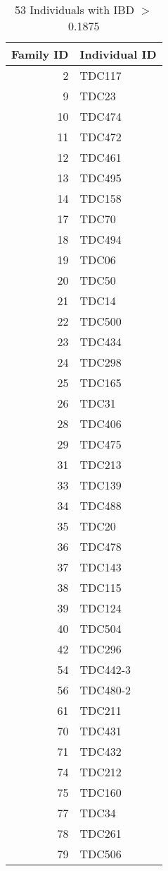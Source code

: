 \begin{table}[ht]
\centering
\caption{53 Individuals with IBD $>$ 0.1875 }
\begin{tabular}{rl}
  \hline
Family ID & Individual ID \\ 
  \hline
  2 & TDC117 \\ 
    9 & TDC23 \\ 
   10 & TDC474 \\ 
   11 & TDC472 \\ 
   12 & TDC461 \\ 
   13 & TDC495 \\ 
   14 & TDC158 \\ 
   17 & TDC70 \\ 
   18 & TDC494 \\ 
   19 & TDC06 \\ 
   20 & TDC50 \\ 
   21 & TDC14 \\ 
   22 & TDC500 \\ 
   23 & TDC434 \\ 
   24 & TDC298 \\ 
   25 & TDC165 \\ 
   26 & TDC31 \\ 
   28 & TDC406 \\ 
   29 & TDC475 \\ 
   31 & TDC213 \\ 
   33 & TDC139 \\ 
   34 & TDC488 \\
   35 & TDC20 \\ 
   36 & TDC478 \\ 
   37 & TDC143 \\ 
   38 & TDC115 \\ 
   39 & TDC124 \\ 
   40 & TDC504 \\ 
   42 & TDC296 \\ 
   54 & TDC442-3 \\ 
   56 & TDC480-2 \\ 
   61 & TDC211 \\
   70 & TDC431 \\ 
   71 & TDC432 \\ 
   74 & TDC212 \\ 
   75 & TDC160 \\ 
   77 & TDC34 \\ 
   78 & TDC261 \\ 
   79 & TDC506 \\ 

\end{tabular}
\end{table}
